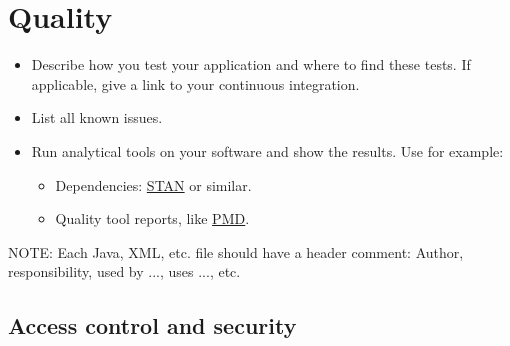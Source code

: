 \section{Quality}

\begin{itemize}
	\item Describe how you test your application and where to find these tests. If
	      applicable, give a link to your continuous integration.
	\item List all known issues.
	\item Run analytical tools on your software and show the results. Use for example:
	      \begin{itemize}
		      \item Dependencies: \href{http://stan4j.com/}{STAN} or similar.
		      \item Quality tool reports, like \href{http://filehippo.com/download_pmd/}{PMD}.
	      \end{itemize}
\end{itemize}

NOTE: Each Java, XML, etc. file should have a header comment: Author,
responsibility, used by ..., uses ..., etc.


\subsection{Access control and security}